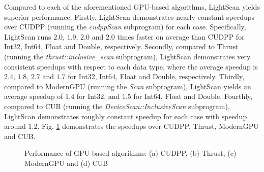 \documentclass[article]{elsarticle}
\begin{document}
{Compared to each of the aforementioned GPU-based algorithms, LightScan yields superior performance. Firstly, LightScan demonstrates nearly constant speedups over CUDPP (running the \textit{cudppScan} subprogram) for each case. Specifically, LightScan runs $2.0$, $1.9$, $2.0$ and $2.0$ times faster on average than CUDPP for Int32, Int64, Float and Double, respectively. Secondly, compared to Thrust (running the \textit{thrust::inclusive\_scan} subprogram), LightScan demonstrates very consistent speedups with respect to each data type, where the average speedup is $2.4$, $1.8$, $2.7$ and $1.7$ for Int32, Int64, Float and Double, respectively. Thirdly, compared to ModernGPU (running the \textit{Scan} subprogram), LightScan yields an average speedup of $1.4$ for Int32, and $1.5$ for Int64, Float and Double. Fourthly, compared to CUB (running the \textit{DeviceScan::InclusiveScan} subprogram), LightScan  demonstrates roughly constant speedup for each case with speedup around $1.2$. Fig. \ref{fig:gpu_others} demonstrates the speedups over CUDPP, Thrust, ModernGPU and CUB.
\begin{figure}[!h]
\centering

\begin{minipage}[b]{0.49\linewidth}
\end{minipage}
\begin{minipage}[b]{0.49\linewidth}
\end{minipage}

\begin{minipage}[b]{0.49\linewidth}
\end{minipage}
\begin{minipage}[b]{0.49\linewidth}
\end{minipage}

\caption{Performance of GPU-based algorithms: (a) CUDPP, (b) Thrust, (c) ModernGPU and (d) CUB}
\label{fig:gpu_others}
\end{figure}
}
\end{document}
